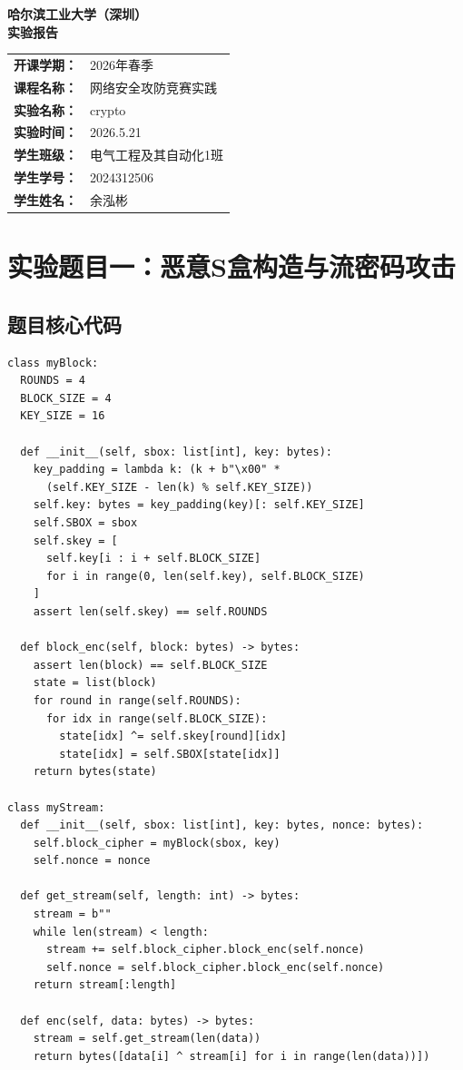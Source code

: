 \documentclass[12pt,a4paper,UTF8]{ctexart}
\begin{document}
\begin{center}
    \Huge \textbf{哈尔滨工业大学（深圳）} \\
    \vspace{0.5cm}
    \Huge \textbf{实验报告}
\end{center}

\vspace{1.2cm}

\begin{center}
\begin{tabular}{ll}
    \textbf{开课学期：} & 2026年春季 \\
    \textbf{课程名称：} & 网络安全攻防竞赛实践 \\
    \textbf{实验名称：} & crypto \\
    \textbf{实验时间：} & 2026.5.21 \\
    \textbf{学生班级：} & 电气工程及其自动化1班 \\
    \textbf{学生学号：} & 2024312506 \\
    \textbf{学生姓名：} & 余泓彬 \\
\end{tabular}
\end{center}

\newpage

\section{实验题目一：恶意S盒构造与流密码攻击}

\subsection{题目核心代码}
\begin{lstlisting}
class myBlock:
  ROUNDS = 4
  BLOCK_SIZE = 4
  KEY_SIZE = 16

  def __init__(self, sbox: list[int], key: bytes):
    key_padding = lambda k: (k + b"\x00" * 
      (self.KEY_SIZE - len(k) % self.KEY_SIZE))
    self.key: bytes = key_padding(key)[: self.KEY_SIZE]
    self.SBOX = sbox
    self.skey = [
      self.key[i : i + self.BLOCK_SIZE]
      for i in range(0, len(self.key), self.BLOCK_SIZE)
    ]
    assert len(self.skey) == self.ROUNDS

  def block_enc(self, block: bytes) -> bytes:
    assert len(block) == self.BLOCK_SIZE
    state = list(block)
    for round in range(self.ROUNDS):
      for idx in range(self.BLOCK_SIZE):
        state[idx] ^= self.skey[round][idx]
        state[idx] = self.SBOX[state[idx]]
    return bytes(state)

class myStream:
  def __init__(self, sbox: list[int], key: bytes, nonce: bytes):
    self.block_cipher = myBlock(sbox, key)
    self.nonce = nonce

  def get_stream(self, length: int) -> bytes:
    stream = b""
    while len(stream) < length:
      stream += self.block_cipher.block_enc(self.nonce)
      self.nonce = self.block_cipher.block_enc(self.nonce)
    return stream[:length]

  def enc(self, data: bytes) -> bytes:
    stream = self.get_stream(len(data))
    return bytes([data[i] ^ stream[i] for i in range(len(data))])
\end{lstlisting}
\end{document}
